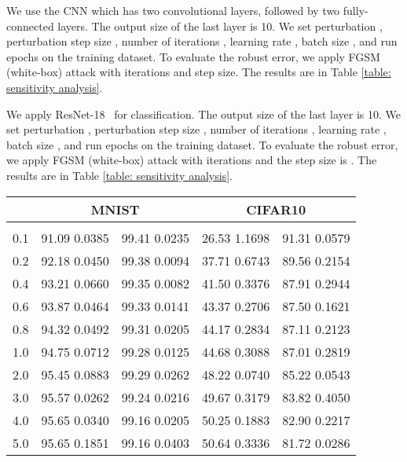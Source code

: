\documentclass[11pt]{article}
\newcommand{\0}{\mathbf{0}}
\newcommand{\1}{\mathbf{1}}
\begin{document}
\medskip
{} We use the CNN which has two convolutional layers, followed by two fully-connected layers. The output size of the last layer is 10. We set perturbation , perturbation step size , number of iterations , learning rate , batch size , and run  epochs on the training dataset. To evaluate the robust error, we apply FGSM (white-box) attack with  iterations and  step size. The results are in Table \ref{table: sensitivity analysis}.

\medskip
{} We apply ResNet-18~\cite{he2016deep} for classification. The output size of the last layer is 10. We set perturbation , perturbation step size , number of iterations , learning rate , batch size , and run  epochs on the training dataset. To evaluate the robust error, we apply FGSM (white-box) attack with  iterations and the step size is . The results are in Table \ref{table: sensitivity analysis}.

\begin{table*}
	\caption{Sensitivity of regularization hyperparameter  on MNIST and CIFAR10 datasets.}
	\label{table: sensitivity analysis}
	\centering
\begin{tabular}{c|cc||cc}\hline
		& \multicolumn{2}{c}{MNIST} & \multicolumn{2}{c}{CIFAR10}\\
		\hline
		 &     &    &   &   \\
		\hline
		0.1 & 91.09  0.0385 & 99.41  0.0235 & 26.53  1.1698 & 91.31  0.0579 \\
		0.2 & 92.18  0.0450 & 99.38  0.0094 & 37.71  0.6743 & 89.56  0.2154\\
		0.4 & 93.21  0.0660 & 99.35  0.0082 & 41.50  0.3376 & 87.91  0.2944\\
		0.6 & 93.87  0.0464 & 99.33  0.0141 & 43.37  0.2706 & 87.50  0.1621\\
		0.8 & 94.32  0.0492 & 99.31  0.0205 & 44.17  0.2834 & 87.11  0.2123\\
		1.0 & 94.75  0.0712 & 99.28  0.0125 & 44.68  0.3088 & 87.01  0.2819\\
		2.0 & 95.45  0.0883 & 99.29  0.0262 & 48.22  0.0740 & 85.22  0.0543\\
		3.0 & 95.57  0.0262 & 99.24  0.0216 & 49.67  0.3179 & 83.82  0.4050\\
		4.0 & 95.65  0.0340 & 99.16  0.0205 & 50.25  0.1883 & 82.90  0.2217\\
		5.0 & 95.65  0.1851 & 99.16  0.0403 & 50.64  0.3336 & 81.72  0.0286\\
		\hline
	\end{tabular}
\end{table*}
\end{document}
